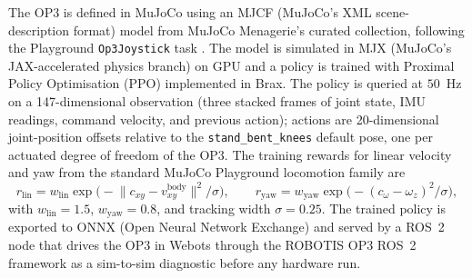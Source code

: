 The OP3 is defined in MuJoCo using an MJCF (MuJoCo's XML scene-description
format) model from MuJoCo Menagerie's curated collection, following the
Playground \texttt{Op3Joystick} task
\citep{Zakka2022-mujoco-menagerie-collection-high-quality-simulation-models,Zakka2025-demonstrating-mujoco-playground,GoogleDeepMind2025-mujoco-playground-gpu-accelerated-robot-learning-sim-to-real-transfer}.
The model is simulated in MJX (MuJoCo's JAX-accelerated physics branch) on GPU
and a policy is trained with Proximal Policy Optimisation (PPO) implemented in
Brax. The policy is queried at $50$~Hz on a 147-dimensional observation (three
stacked frames of joint state, IMU readings, command velocity, and previous
action); actions are 20-dimensional joint-position offsets relative to the
\texttt{stand\_bent\_knees} default pose, one per actuated degree of freedom of
the OP3. The training rewards for linear velocity and yaw from the standard MuJoCo Playground locomotion
family are
\begin{equation}
\label{eq:reward-tracking}
r_{\text{lin}} = w_{\text{lin}} \exp\!\big(-\lVert c_{xy} - v^{\text{body}}_{xy} \rVert^2 / \sigma\big), \qquad
r_{\text{yaw}} = w_{\text{yaw}} \exp\!\big(-(c_\omega - \omega_z)^2 / \sigma\big),
\end{equation}
with $w_{\text{lin}} = 1.5$, $w_{\text{yaw}} = 0.8$, and tracking width
$\sigma = 0.25$. The trained policy is exported to ONNX (Open Neural Network Exchange) and served by a ROS~2 node that drives the OP3 in Webots through the ROBOTIS OP3 ROS~2 framework as a sim-to-sim diagnostic before any hardware run.

